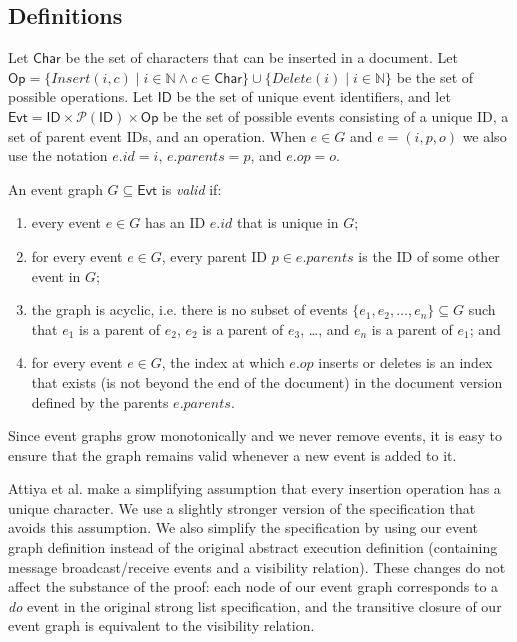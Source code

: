 \documentclass[sigplan,10pt]{acmart}
\begin{document}
\subsection{Definitions}

Let $\mathsf{Char}$ be the set of characters that can be inserted in a document.
Let $\mathsf{Op} = \{\mathit{Insert}(i, c) \mid i \in \mathbb{N} \wedge c \in \mathsf{Char}\} \cup \{\mathit{Delete}(i) \mid i \in \mathbb{N}\}$ be the set of possible operations.
Let $\mathsf{ID}$ be the set of unique event identifiers, and let $\mathsf{Evt} = \mathsf{ID} \times \mathcal{P}(\mathsf{ID}) \times \mathsf{Op}$ be the set of possible events consisting of a unique ID, a set of parent event IDs, and an operation.
When $e \in G$ and $e = (i,p,o)$ we also use the notation $e.\mathit{id} = i$, $e.\mathit{parents} = p$, and $e.\mathit{op} = o$.

\begin{definition}\label{valid-graph}
  An event graph $G \subseteq \mathsf{Evt}$ is \emph{valid} if:
  \begin{enumerate}
    \item every event $e \in G$ has an ID $e.\mathit{id}$ that is unique in $G$;
    \item for every event $e \in G$, every parent ID $p \in e.\mathit{parents}$ is the ID of some other event in $G$;
    \item the graph is acyclic, i.e. there is no subset of events $\{e_1, e_2, \dots, e_n\} \subseteq G$ such that $e_1$ is a parent of $e_2$, $e_2$ is a parent of $e_3$, \dots, and $e_n$ is a parent of $e_1$; and
    \item for every event $e \in G$, the index at which $e.\mathit{op}$ inserts or deletes is an index that exists (is not beyond the end of the document) in the document version defined by the parents $e.\mathit{parents}$.
  \end{enumerate}
\end{definition}

Since event graphs grow monotonically and we never remove events, it is easy to ensure that the graph remains valid whenever a new event is added to it.

Attiya et al. make a simplifying assumption that every insertion operation has a unique character.
We use a slightly stronger version of the specification that avoids this assumption.
We also simplify the specification by using our event graph definition instead of the original abstract execution definition (containing message broadcast/receive events and a visibility relation).
These changes do not affect the substance of the proof: each node of our event graph corresponds to a \emph{do} event in the original strong list specification, and the transitive closure of our event graph is equivalent to the visibility relation.
\end{document}
